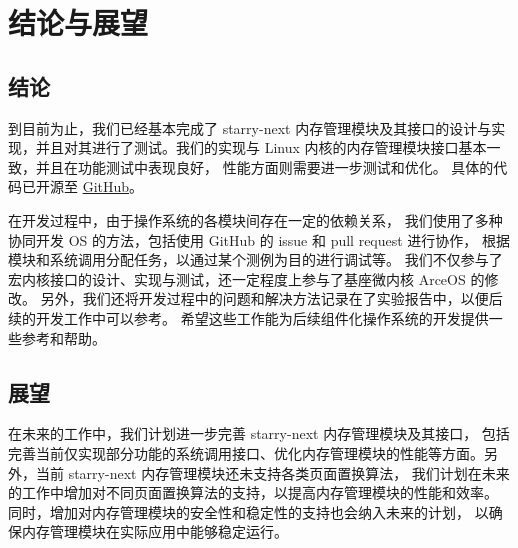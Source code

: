 
\chapter{结论与展望}

\section{结论}

到目前为止，我们已经基本完成了 starry-next 内存管理模块及其接口的设计与实现，并且对其进行了测试。我们的实现与 Linux 内核的内存管理模块接口基本一致，并且在功能测试中表现良好，
性能方面则需要进一步测试和优化。
具体的代码已开源至 \href{https://github.com/chenyihu21/starry-next}{GitHub}。

在开发过程中，由于操作系统的各模块间存在一定的依赖关系，
我们使用了多种协同开发 OS 的方法，包括使用 GitHub 的 issue 和 pull request 进行协作，
根据模块和系统调用分配任务，以通过某个测例为目的进行调试等。
我们不仅参与了宏内核接口的设计、实现与测试，还一定程度上参与了基座微内核 ArceOS 的修改。
另外，我们还将开发过程中的问题和解决方法记录在了实验报告中，以便后续的开发工作中可以参考。
希望这些工作能为后续组件化操作系统的开发提供一些参考和帮助。

\section{展望}

在未来的工作中，我们计划进一步完善 starry-next 内存管理模块及其接口，
包括完善当前仅实现部分功能的系统调用接口、优化内存管理模块的性能等方面。另外，当前 starry-next 内存管理模块还未支持各类页面置换算法，
我们计划在未来的工作中增加对不同页面置换算法的支持，以提高内存管理模块的性能和效率。
同时，增加对内存管理模块的安全性和稳定性的支持也会纳入未来的计划，
以确保内存管理模块在实际应用中能够稳定运行。